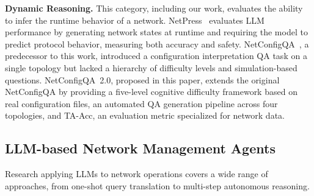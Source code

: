 


\textbf{Dynamic Reasoning.}
This category, including our work, evaluates the ability to infer the runtime behavior of a network.
NetPress~\cite{ref7} evaluates LLM performance by generating network states at runtime and requiring the model to predict protocol behavior, measuring both accuracy and safety.
NetConfigQA~\cite{ref26}, a predecessor to this work, introduced a configuration interpretation QA task on a single topology but lacked a hierarchy of difficulty levels and simulation-based questions.
NetConfigQA~2.0, proposed in this paper, extends the original NetConfigQA by providing a five-level cognitive difficulty framework based on real configuration files, an automated QA generation pipeline across four topologies, and TA-Acc, an evaluation metric specialized for network data.


\subsection{LLM-based Network Management Agents}

Research applying LLMs to network operations covers a wide range of approaches, from one-shot query translation to multi-step autonomous reasoning.

